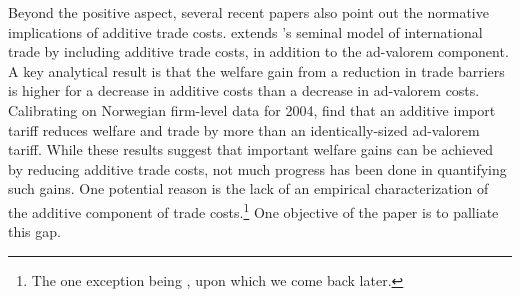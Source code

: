 \documentclass[a4paper,11pt]{article}
\begin{document}
Beyond the positive aspect, several recent papers also point out the normative implications of additive trade costs. \citet{sorensen2014} extends \citet{melitz}'s seminal model of international trade by including additive trade costs, in addition to the ad-valorem component. A key analytical result is that the welfare gain from a reduction in trade barriers is higher for a decrease in additive costs than a decrease in ad-valorem costs. Calibrating on Norwegian firm-level data for 2004, \citet{Irrazabal_2015} find that an additive import tariff reduces welfare and trade by more than an identically-sized ad-valorem tariff. While these results suggest that important welfare gains can be achieved by reducing additive trade costs, not much progress has been done in quantifying such gains. One potential reason is the lack of an empirical characterization of the additive component of trade costs.\footnote{The one exception being \citet{Irrazabal_2015}, upon which we come back later.} One objective of the paper is to palliate this gap. \bigskip
\end{document}
